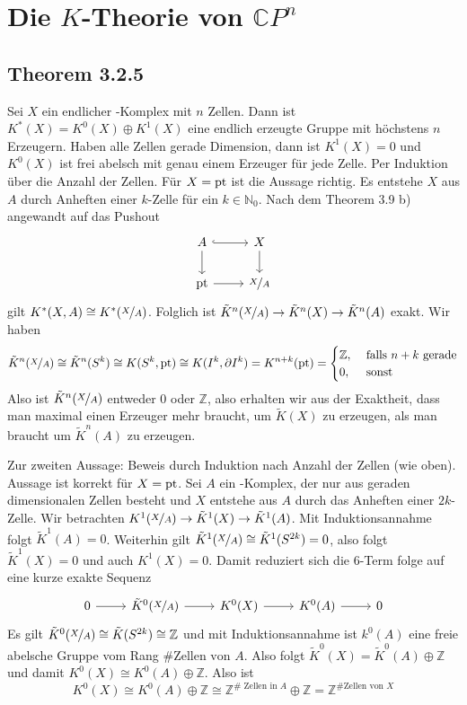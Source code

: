 \section*{Die $K$-Theorie von $\mathds{C}P^n$}

\subsection*{Theorem 3.2.5} %
\label{sub:theorem325}
Sei $X$ ein endlicher \CW-Komplex mit $n$ Zellen. Dann ist $K^*(X) = K^0(X) \oplus K^1(X)$ eine endlich erzeugte Gruppe mit höchstens $n$ Erzeugern. Haben alle Zellen gerade
Dimension, dann ist $K^1(X)=0$ und $K^0(X)$ ist frei abelsch mit genau einem Erzeuger für jede Zelle.
Per Induktion über die Anzahl der Zellen. Für $X=\pt$ ist die Aussage richtig. Es entstehe $X$ aus $A$ durch Anheften einer $k$-Zelle für ein $k \in \mathds{N}_0$. Nach dem
Theorem 3.9 b) angewandt auf das Pushout
\[
	\begin{tikzcd}
		A \rar[hook] \dar & X \dar\\
		\pt \rar & \nicefrac{X}{A}
	\end{tikzcd}
\]
gilt $K^*(X,A) \cong K^*(\nicefrac{X}{A})$. Folglich ist $\tilde{K}^n(\nicefrac{X}{A}) \to \tilde{K}^n(X) \to \tilde{K}^n(A)$ exakt. Wir haben 
\[
	\tilde{K}^n(\nicefrac{X}{A}) \cong \tilde{K}^n(S^k) \cong K(S^k,\pt) \cong K(I^k,\partial I^k) = K^{n+k}(\pt) = \begin{cases}
		\mathds{Z}, &\text{ falls }n+k \text{ gerade}\\
		0 ,&\text{ sonst}
	\end{cases}
\]
Also ist $\tilde{K}^n(\nicefrac{X}{A})$ entweder $0$ oder $\mathds{Z}$, also erhalten wir aus der Exaktheit, dass man maximal einen Erzeuger mehr braucht, um $\tilde{K}(X)$
zu erzeugen, als man braucht um $\tilde{K}^n(A)$ zu erzeugen.

Zur zweiten Aussage: Beweis durch Induktion nach Anzahl der Zellen (wie oben). Aussage ist korrekt für $X=\pt$. Sei $A$ ein \CW-Komplex, der nur aus geraden dimensionalen 
Zellen besteht und $X$ entstehe aus $A$ durch das Anheften einer $2k$-Zelle. Wir betrachten $K^1(\nicefrac{X}{A}) \to \tilde{K}^1(X) \to \tilde{K}^1(A)$. Mit 
Induktionsannahme folgt $\tilde{K}^1(A)=0$. Weiterhin gilt $\tilde{K}^1(\nicefrac{X}{A}) \cong \tilde{K}^1(S^{2k})=0$, also folgt $\tilde{K}^1(X)=0$ und auch $K^1(X)=0$.
Damit reduziert sich die 6-Term folge auf eine kurze exakte Sequenz
\[
	\begin{tikzcd}
		0 \rar & \tilde{K}^0(\nicefrac{X}{A}) \rar & K^0(X) \rar & K^0(A) \rar & 0
	\end{tikzcd}
\]
Es gilt $\tilde{K}^0(\nicefrac{X}{A}) \cong \tilde{K}(S^{2k}) \cong \mathds{Z}$ und mit Induktionsannahme ist $k^0(A)$ eine freie abelsche Gruppe vom Rang 
$\# \text{Zellen von $A$}$. Also folgt $\tilde{K}^0(X) = \tilde{K}^0(A) \oplus \mathds{Z}$ und damit $K^0(X)\cong K^0(A) \oplus \mathds{Z}$. Also ist 
\[
	K^0(X) \cong K^0(A) \oplus \mathds{Z} \cong \mathds{Z}^{\#\text{ Zellen in $A$}} \oplus \mathds{Z} = \mathds{Z}^{\#\text{Zellen von $X$}}
\]

